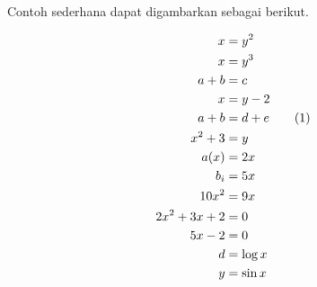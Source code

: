 Contoh sederhana dapat digambarkan sebagai berikut.

\begin{align*}
	x &= y^2\\
	x &= y^3\\
	a + b &= c\\
	x &= y - 2\\
	a + b &= d + e \tag{\stepcounter{equation}\theequation}\\
	x^2 + 3 &= y\\
	a(x) &= 2x\\
	b_i &= 5x\\
	10x^2 &= 9x\\
	2x^2 + 3x + 2 &= 0\\
	5x - 2 &= 0\\
	d &= \log x\\
	y &= \sin x
\end{align*}

